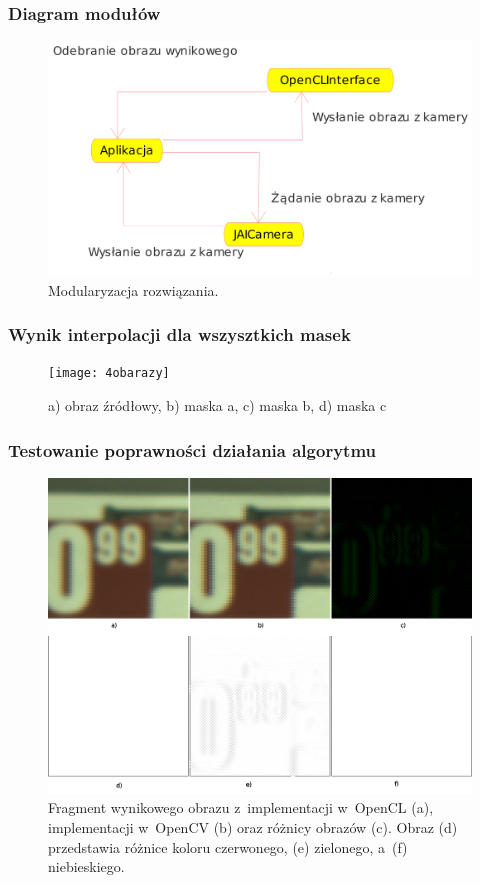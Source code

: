 \documentclass{beamer}
\begin{document}
\begin{frame}
  \frametitle{Diagram modułów}
\begin{figure}
  \centering
  \includegraphics[width=0.8\linewidth]{moduly}
  \caption{Modularyzacja rozwiązania.}
  \label{fig:class_diagram}
\end{figure}
  
\end{frame}

\begin{frame}
  \frametitle{Wynik interpolacji dla wszysztkich masek}

\begin{figure}
  \centering
  \texttt{[image: 4obarazy]}
  \caption{a) obraz źródłowy, b) maska a, c) maska b, d) maska c}
  \label{fig:class_diagram}
\end{figure}

\end{frame}

%
%

\begin{frame}
  \frametitle{Testowanie poprawności działania algorytmu}
\begin{figure}
  \centering
  \includegraphics[width=0.55\linewidth]{result_diff}
  \caption{Fragment wynikowego obrazu z~implementacji w~OpenCL (a), implementacji w~OpenCV (b) oraz różnicy obrazów (c). Obraz (d) przedstawia różnice koloru czerwonego, (e) zielonego, a~(f) niebieskiego.}
  \label{fig:result_diff}
\end{figure}
\end{frame}
\end{document}
